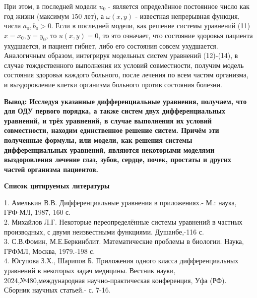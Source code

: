 \documentclass[11pt, a4paper]{article}
\begin{document}
	При этом, в последней модели $u_0$ - является определённое постоянное число как год жизни (максимум 150 лет), а $\omega(x,y)$ - известная непрерывная функция, числа $a_0,b_0>0$. Если в последней модели, как решение системы уравнений   (11) $x=x_0,y=y_0$, то $u(x,y)=0$, то это означает, что состояние здоровья пациента ухудшается, и пациент гибнет, либо его состояния совсем ухудшается. Аналогичным образом, интегрируя модельных систем уравнений (12)-(14), в случае тождественного выполнения их условий совместности, получим модель состояния здоровья  каждого больного, после лечения по всем частям организма, и выздоровление клетки организма больного против состояния болезни.
	
	\bf Вывод: \rm Исследуя указанные дифференциальные уравнения, получаем, что для ОДУ первого порядка, а также систем двух дифференциальных уравнений, и трёх уравнений, в случае выполнения их условий совместности, находим единственное решение  систем. Причём эти полученные формулы, или модели, как решения системы дифференциальных уравнений, являются некоторыми моделями выздоровления лечение глаз, зубов, сердце, почек, простаты и других частей организма пациентов.
	
	\begin{center}
		\bf Список цитируемых литературы
	\end{center}
	1.	Амелькин В.В. Дифференциальные уравнения в приложениях.- М.: наука, ГРФ-МЛ, 1987, 160 с.\\
	2.	Михайлов Л.Г. Некоторые переопределённые системы уравнений в  
	частных производных, с двумя неизвестными функциями. Душанбе,-116 с.\\
	3.	С.В.Фомин, М.Е.Беркинблит. Математические проблемы в биологии. Наука, ГРФМЛ, Москва, 1979.-198 с.\\
	4.	Юсупова З.Х., Шарипов Б. Приложения одного класса дифференциальных уравнений в некоторых задач медицины. Вестник науки, 2024,№480,международная научно-практическая конференция, Уфа (РФ). Сборник научных статьей.-  с. 7-16.
	
\end{document}
